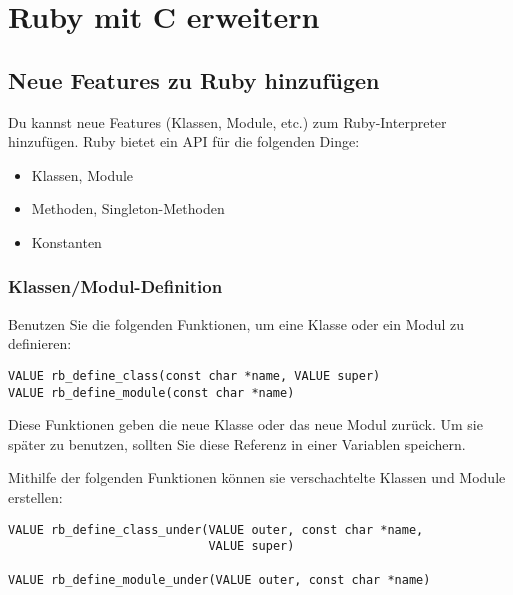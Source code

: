 \chapter{Ruby mit C erweitern}
\label{cha:ruby-erweitern}

\section{Neue Features zu Ruby hinzufügen}
\label{sec:neue-features}

Du kannst neue Features (Klassen, Module, etc.) zum Ruby-Interpreter
hinzufügen. Ruby bietet ein API für die folgenden Dinge:

\begin{itemize}
\item Klassen, Module
\item Methoden, Singleton-Methoden
\item Konstanten
\end{itemize}

\subsection{Klassen/Modul-Definition}

Benutzen Sie die folgenden Funktionen, um eine Klasse oder ein Modul
zu definieren:

\begin{lstlisting}
VALUE rb_define_class(const char *name, VALUE super)
VALUE rb_define_module(const char *name)
\end{lstlisting}

\noindent Diese Funktionen geben die neue Klasse oder das neue Modul
zurück. Um sie später zu benutzen, sollten Sie diese Referenz in einer
Variablen speichern.

Mithilfe der folgenden Funktionen können sie verschachtelte Klassen
und Module erstellen:

\begin{lstlisting}
VALUE rb_define_class_under(VALUE outer, const char *name,
                            VALUE super)

VALUE rb_define_module_under(VALUE outer, const char *name)
\end{lstlisting}


